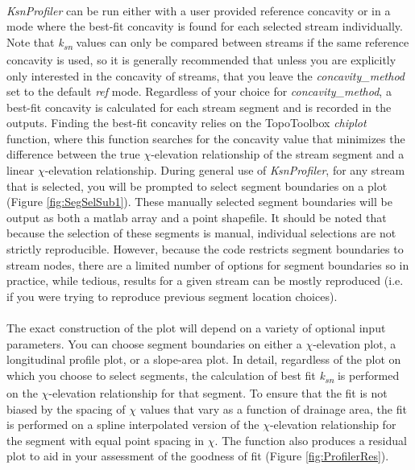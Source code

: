 \paragraph{}\textit{KsnProfiler} can be run either with a user provided reference concavity or in a mode where the best-fit concavity is found for each selected stream individually. Note that \textit{k\textsubscript{sn}} values can only be compared between streams if the same reference concavity is used, so it is generally recommended that unless you are explicitly only interested in the concavity of streams, that you leave the \textit{concavity\_method} set to the default \textit{ref} mode. Regardless of your choice for \textit{concavity\_method}, a best-fit concavity is calculated for each stream segment and is recorded in the outputs. Finding the best-fit concavity relies on the TopoToolbox \textit{chiplot} function, where this function searches for the concavity value that minimizes the difference between the true $\chi$-elevation relationship of the stream segment and a linear $\chi$-elevation relationship. During general use of \textit{KsnProfiler}, for any stream that is selected, you will be prompted to select segment boundaries on a plot (Figure \ref{fig:SegSelSub1}). These manually selected segment boundaries will be output as both a matlab array and a point shapefile. It should be noted that because the selection of these segments is manual, individual selections are not strictly reproducible. However, because the code restricts segment boundaries to stream nodes, there are a limited number of options for segment boundaries so in practice, while tedious, results for a given stream can be mostly reproduced (i.e. if you were trying to reproduce previous segment location choices).

\paragraph{}The exact construction of the plot will depend on a variety of optional input parameters. You can choose segment boundaries on either a $\chi$-elevation plot, a longitudinal profile plot, or a slope-area plot. In detail, regardless of the plot on which you choose to select segments, the calculation of best fit \textit{k\textsubscript{sn}} is performed on the $\chi$-elevation relationship for that segment. To ensure that the fit is not biased by the spacing of $\chi$ values that vary as a function of drainage area, the fit is performed on a spline interpolated version of the $\chi$-elevation relationship for the segment with equal point spacing in $\chi$. The function also produces a residual plot to aid in your assessment of the goodness of fit (Figure \ref{fig:ProfilerRes}).

